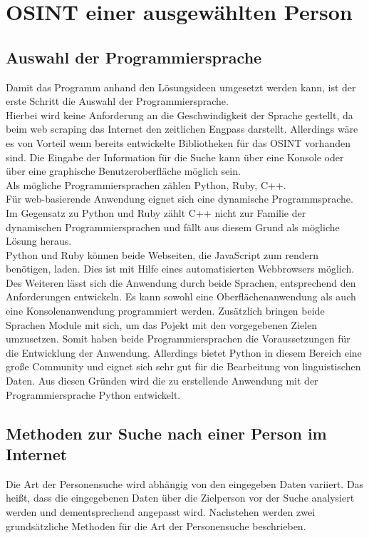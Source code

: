 
\chapter{OSINT einer ausgewählten Person}  %
\label{cha:Informationsbeschaffung einer ausgewählten Person} %

\section{Auswahl der Programmiersprache}
Damit das Programm anhand den Lösungsideen umgesetzt werden kann, ist der erste Schritt die Auswahl der Programmiersprache.\\
Hierbei wird keine Anforderung an die Geschwindigkeit der Sprache gestellt, da beim web scraping das Internet den zeitlichen Engpass darstellt. Allerdings wäre es von Vorteil wenn bereits entwickelte Bibliotheken für das OSINT vorhanden sind. Die Eingabe der Information für die Suche kann über eine Konsole oder über eine graphische Benutzeroberfläche möglich sein.\\
Als mögliche Programmiersprachen zählen Python, Ruby, C++.\\
Für web-basierende Anwendung eignet sich eine dynamische Programmsprache.
Im Gegensatz zu Python und Ruby zählt C++ nicht zur Familie der dynamischen Programmiersprachen und fällt aus diesem Grund als mögliche Lösung heraus. \\
Python und Ruby können beide Webseiten, die JavaScript zum rendern benötigen, laden. Dies ist mit Hilfe eines automatisierten Webbrowsers möglich. Des Weiteren lässt sich die Anwendung durch beide Sprachen, entsprechend den Anforderungen entwickeln. Es kann sowohl eine Oberflächenanwendung als auch eine Konsolenanwendung programmiert werden. Zusätzlich bringen beide Sprachen Module mit sich, um das Pojekt mit den vorgegebenen Zielen umzusetzen. Somit haben beide Programmiersprachen die Voraussetzungen für die Entwicklung der Anwendung. Allerdings bietet Python in diesem Bereich eine große Community und eignet sich sehr gut für die Bearbeitung von linguistischen Daten. \cite{bird2009natural}
Aus diesen Gründen wird die zu erstellende Anwendung mit der Programmiersprache Python entwickelt.
	
\section{Methoden zur Suche nach einer Person im Internet}
\label{sec:Suche nach Information}
Die Art der Personensuche wird abhängig von den eingegeben Daten  variiert. Das heißt, dass die eingegebenen Daten über die Zielperson vor der Suche analysiert werden und dementsprechend angepasst wird. Nachstehen werden zwei grundsätzliche Methoden für die Art der Personensuche beschrieben.

